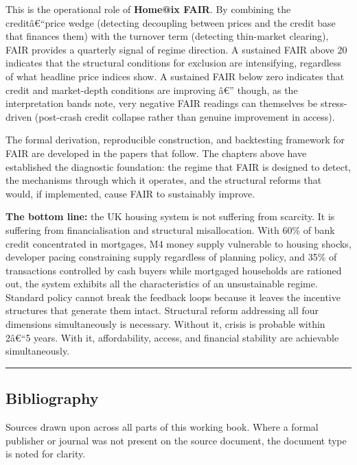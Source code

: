 This is the operational role of \textbf{Home@ix FAIR}. By combining the
creditâ€``price wedge (detecting decoupling between prices and the
credit base that finances them) with the turnover term (detecting
thin-market clearing), FAIR provides a quarterly signal of regime
direction. A sustained FAIR above 20 indicates that the structural
conditions for exclusion are intensifying, regardless of what headline
price indices show. A sustained FAIR below zero indicates that credit
and market-depth conditions are improving â€'' though, as the
interpretation bands note, very negative FAIR readings can themselves be
stress-driven (post-crash credit collapse rather than genuine
improvement in access).

The formal derivation, reproducible construction, and backtesting
framework for FAIR are developed in the papers that follow. The chapters
above have established the diagnostic foundation: the regime that FAIR
is designed to detect, the mechanisms through which it operates, and the
structural reforms that would, if implemented, cause FAIR to sustainably
improve.

\textbf{The bottom line:} the UK housing system is not suffering from
scarcity. It is suffering from financialisation and structural
misallocation. With 60\% of bank credit concentrated in mortgages, M4
money supply vulnerable to housing shocks, developer pacing constraining
supply regardless of planning policy, and 35\% of transactions
controlled by cash buyers while mortgaged households are rationed out,
the system exhibits all the characteristics of an unsustainable regime.
Standard policy cannot break the feedback loops because it leaves the
incentive structures that generate them intact. Structural reform
addressing all four dimensions simultaneously is necessary. Without it,
crisis is probable within 2â€``5 years. With it, affordability, access,
and financial stability are achievable simultaneously.

\begin{center}\rule{0.5\linewidth}{0.5pt}\end{center}

\subsection{Bibliography}\label{bibliography}

Sources drawn upon across all parts of this working book. Where a formal
publisher or journal was not present on the source document, the
document type is noted for clarity.

